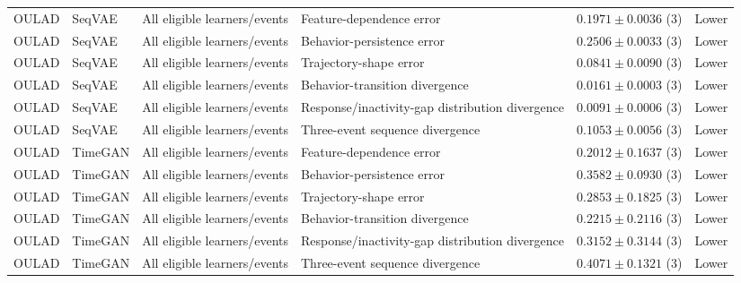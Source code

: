 \begin{longtable}{@{}p{2.25cm}p{2.05cm}p{4.7cm}p{5.0cm}p{2.6cm}p{1.25cm}@{}}
OULAD & SeqVAE & All eligible learners/events & Feature-dependence error & $0.1971 \mathbin{\pm} 0.0036$ (3) & Lower \\
OULAD & SeqVAE & All eligible learners/events & Behavior-persistence error & $0.2506 \mathbin{\pm} 0.0033$ (3) & Lower \\
OULAD & SeqVAE & All eligible learners/events & Trajectory-shape error & $0.0841 \mathbin{\pm} 0.0090$ (3) & Lower \\
OULAD & SeqVAE & All eligible learners/events & Behavior-transition divergence & $0.0161 \mathbin{\pm} 0.0003$ (3) & Lower \\
OULAD & SeqVAE & All eligible learners/events & Response/inactivity-gap distribution divergence & $0.0091 \mathbin{\pm} 0.0006$ (3) & Lower \\
OULAD & SeqVAE & All eligible learners/events & Three-event sequence divergence & $0.1053 \mathbin{\pm} 0.0056$ (3) & Lower \\
OULAD & TimeGAN & All eligible learners/events & Feature-dependence error & $0.2012 \mathbin{\pm} 0.1637$ (3) & Lower \\
OULAD & TimeGAN & All eligible learners/events & Behavior-persistence error & $0.3582 \mathbin{\pm} 0.0930$ (3) & Lower \\
OULAD & TimeGAN & All eligible learners/events & Trajectory-shape error & $0.2853 \mathbin{\pm} 0.1825$ (3) & Lower \\
OULAD & TimeGAN & All eligible learners/events & Behavior-transition divergence & $0.2215 \mathbin{\pm} 0.2116$ (3) & Lower \\
OULAD & TimeGAN & All eligible learners/events & Response/inactivity-gap distribution divergence & $0.3152 \mathbin{\pm} 0.3144$ (3) & Lower \\
OULAD & TimeGAN & All eligible learners/events & Three-event sequence divergence & $0.4071 \mathbin{\pm} 0.1321$ (3) & Lower \\
\end{longtable}
